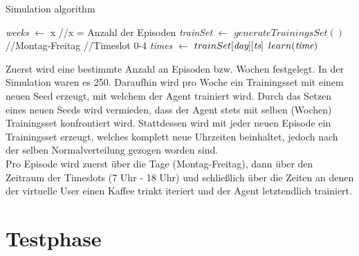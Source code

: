 \begin{algorithm}
    \caption{Simulation algorithm}\label{euclid}
    \begin{algorithmic}[1]
    \State \emph{weeks} $\gets$ x   \hfill         //x = Anzahl der Episoden
       \State \emph{trainSet} $\gets$ $generateTrainingsSet()$
           \hfill         //Montag-Freitag
              \hfill         //Timeslot 0-4
       \State \emph{times} $\gets$ $trainSet[\emph{day}][\emph{ts}]$
       \State $learn(\emph{time})$
       \EndFor
                \EndFor
            \EndFor
       \EndFor
    \end{algorithmic}
    \end{algorithm}

Zuerst wird eine bestimmte Anzahl an Episoden bzw. Wochen festgelegt. In der Simulation waren es 250. Daraufhin wird pro Woche ein Trainingsset mit einem neuen Seed erzeugt, mit welchem der Agent trainiert wird. Durch das Setzen eines neuen Seeds wird vermieden, dass der Agent stets mit selben (Wochen) Trainingsset konfrontiert wird. Stattdessen wird mit jeder neuen Episode ein Trainingsset erzeugt, welches komplett neue Uhrzeiten beinhaltet, jedoch nach der selben Normalverteilung gezogen worden sind.\\
Pro Episode wird zuerst über die Tage (Montag-Freitag), dann über den Zeitraum der Timeslots (7 Uhr - 18 Uhr) und schließlich über die Zeiten an denen der virtuelle User einen Kaffee trinkt iteriert und der Agent letztendlich trainiert.\\

\section{Testphase}
\label{sec:testphase}


